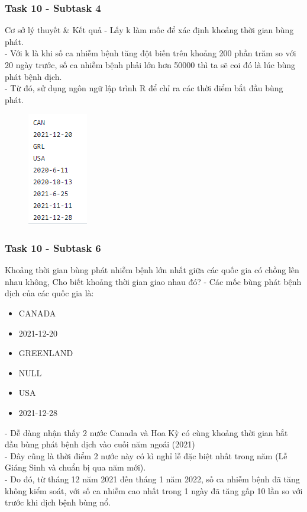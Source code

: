 \documentclass[english,10pt,table]{beamer}
\begin{document}
{
    \frametitle{Task 10 - Subtask 4}
    \begin{block}{Cơ sở lý thuyết \& Kết quả}
    - Lấy k làm mốc để xác định khoảng thời gian bùng phát.\\
    - Với k là khi số ca nhiễm bệnh tăng đột biến trên khoảng 200 phần trăm so với 20 ngày trước, số ca nhiễm bệnh phải lớn hơn 50000 thì ta sẽ coi đó là lúc bùng phát bệnh dịch.\\
    - Từ đó, sử dụng ngôn ngữ lập trình R để chỉ ra các thời điểm bắt đầu bùng phát.\\
	\begin{figure}[H]
        \centering
        \includegraphics[scale=0.9]{images/10.4.png}
    \end{figure}
    \end{block}
}
\frame
{
    \frametitle{Task 10 - Subtask 6}
    \begin{block}{Khoảng thời gian bùng phát nhiễm bệnh lớn nhất giữa các quốc gia có chồng lên nhau không, Cho biết khoảng thời gian giao nhau đó?}
    - Các mốc bùng phát bệnh dịch của các quốc gia là:\\
        \begin{itemize}
            \item CANADA\\
            \item 2021-12-20\\
            \item GREENLAND\\
            \item NULL\\
            \item USA\\
            \item 2021-12-28\\
        \end{itemize}
    - Dễ dàng nhận thấy 2 nước Canada và Hoa Kỳ có cùng khoảng thời gian bắt đầu bùng phát bệnh dịch vào cuối năm ngoái (2021)\\
    - Đây cũng là thời điểm 2 nước này có kì nghỉ lễ đặc biệt nhất trong năm (Lễ Giáng Sinh và chuẩn bị qua năm mới).\\
    - Do đó, từ tháng 12 năm 2021 đến tháng 1 năm 2022, số ca nhiễm bệnh đã tăng không kiểm soát, với số ca nhiễm cao nhất trong 1 ngày đã tăng gấp 10 lần so với trước khi dịch bệnh bùng nổ.
    \end{block}
}
\end{document}
